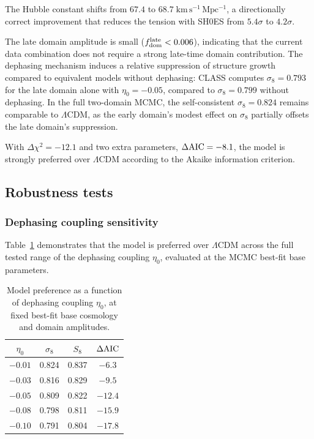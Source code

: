 \documentclass[aps,prd,twocolumn,superscriptaddress,nofootinbib]{revtex4-2}
\newcommand{\fdom}{f_{\rm dom}}
\newcommand{\dAIC}{\Delta{\rm AIC}}
\newcommand{\dchi}{\Delta\chi^2}
\begin{document}
The Hubble constant shifts from $67.4$ to
$68.7\;\mathrm{km\,s^{-1}\,Mpc^{-1}}$, a directionally correct
improvement that reduces the tension with SH0ES from $5.4\sigma$
to $4.2\sigma$.

The late domain amplitude is small ($\fdom^{\rm late} < 0.006$),
indicating that the current data combination does not require a
strong late-time domain contribution. The dephasing mechanism
induces a relative suppression of structure growth compared to
equivalent models without dephasing: CLASS computes $\sigma_8 =
0.793$ for the late domain alone with $\eta_0 = -0.05$, compared
to $\sigma_8 = 0.799$ without dephasing. In the full two-domain
MCMC, the self-consistent $\sigma_8 = 0.824$ remains comparable to
$\Lambda$CDM, as the early domain's modest effect on $\sigma_8$
partially offsets the late domain's suppression.

With $\dchi = -12.1$ and two extra parameters, $\dAIC = -8.1$,
the model is strongly preferred over $\Lambda$CDM according to
the Akaike information criterion.

\subsection{Robustness tests}

\subsubsection{Dephasing coupling sensitivity}

Table~\ref{tab:eta_robust} demonstrates that the model is preferred
over $\Lambda$CDM across the full tested range of the dephasing
coupling $\eta_0$, evaluated at the MCMC best-fit base parameters.

\begin{table}[h]
\centering
\caption{Model preference as a function of dephasing coupling $\eta_0$,
at fixed best-fit base cosmology and domain amplitudes.}
\label{tab:eta_robust}
\begin{tabular}{cccc}
\hline\hline
$\eta_0$ & $\sigma_8$ & $S_8$ & $\dAIC$ \\
\hline
$-0.01$ & 0.824 & 0.837 & $-6.3$ \\
$-0.03$ & 0.816 & 0.829 & $-9.5$ \\
$-0.05$ & 0.809 & 0.822 & $-12.4$ \\
$-0.08$ & 0.798 & 0.811 & $-15.9$ \\
$-0.10$ & 0.791 & 0.804 & $-17.8$ \\
\hline\hline
\end{tabular}
\end{table}
\end{document}
